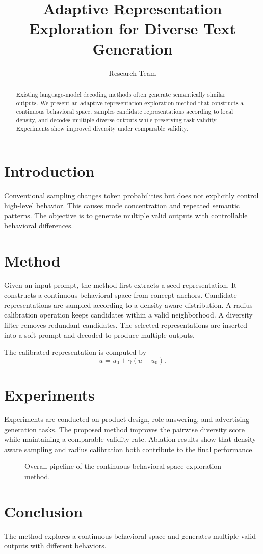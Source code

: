 \documentclass{article}
\title{Adaptive Representation Exploration for Diverse Text Generation}
\author{Research Team}
\begin{document}
\maketitle

\begin{abstract}
Existing language-model decoding methods often generate semantically similar outputs. We present an adaptive representation exploration method that constructs a continuous behavioral space, samples candidate representations according to local density, and decodes multiple diverse outputs while preserving task validity. Experiments show improved diversity under comparable validity.
\end{abstract}

\section{Introduction}
Conventional sampling changes token probabilities but does not explicitly control high-level behavior. This causes mode concentration and repeated semantic patterns. The objective is to generate multiple valid outputs with controllable behavioral differences.

\section{Method}
Given an input prompt, the method first extracts a seed representation. It constructs a continuous behavioral space from concept anchors. Candidate representations are sampled according to a density-aware distribution. A radius calibration operation keeps candidates within a valid neighborhood. A diversity filter removes redundant candidates. The selected representations are inserted into a soft prompt and decoded to produce multiple outputs.

The calibrated representation is computed by
\begin{equation}
\hat{u}=u_0+\gamma(u-u_0).
\end{equation}

\section{Experiments}
Experiments are conducted on product design, role answering, and advertising generation tasks. The proposed method improves the pairwise diversity score while maintaining a comparable validity rate. Ablation results show that density-aware sampling and radius calibration both contribute to the final performance.

\begin{figure}
\caption{Overall pipeline of the continuous behavioral-space exploration method.}
\label{fig:pipeline}
\end{figure}

\section{Conclusion}
The method explores a continuous behavioral space and generates multiple valid outputs with different behaviors.
\end{document}
